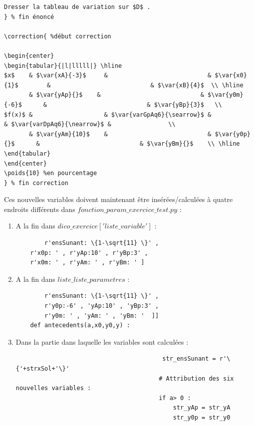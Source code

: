 {\begin{description}
\begin{description}
{\begin{verbatim}
Dresser la tableau de variation sur $D$ .
} % fin énoncé 

\correction{ %début correction 

\begin{center}
\begin{tabular}{|l|lllll|} \hline
$x$    & $\var{xA}{-3}$     &                            & $\var{x0}{1}$        &                            & $\var{xB}{4}$  \\ \hline
       & $\var{yAp}{}$    &                            & $\var{y0m}{-6}$      &                            & $\var{yBp}{3}$   \\ 
$f(x)$ &                    & $\var{varGpAq6}{\searrow}$ &                      & $\var{varDpAq6}{\nearrow}$ &                \\
       & $\var{yAm}{10}$    &                            & $\var{y0p}{}$      &                            & $\var{yBm}{}$    \\ \hline
\end{tabular}
\end{center}
\poids{10} %en pourcentage
} % fin correction   
  \end{verbatim}
  }
  Ces nouvelles variables doivent maintenant être insérées/calculées à quatre endroits différents dans $fonction\_param\_exercice\_test.py$ :
  \begin{enumerate}
   \item A la fin dans  $dico\_exercice['liste\_variable']$  :
   \begin{verbatim}
        r'ensSunant: \{1-\sqrt{11} \}' ,
    r'x0p: ' , r'yAp:10' , r'yBp:3' , 
    r'x0m: ' , r'yAm: ' , r'yBm: ' ]
   \end{verbatim}
   \item A la fin dans   $liste\_liste\_parametres$  :
\begin{verbatim}
        r'ensSunant: \{1-\sqrt{11} \}' ,
        r'y0p:-6' , 'yAp:10' , 'yBp:3' , 
        r'y0m: ' , 'yAm: ' , 'yBm: '  ]] 
    def antecedents(a,x0,y0,y) :
\end{verbatim}
\item Dans la partie dans laquelle les variables sont calculées :
\begin{verbatim}
                                         str_ensSunant = r'\{'+strxSol+'\}' 
                                        # Attribution des six nouvelles variables : 
                                        if a> 0 :
                                            str_yAp = str_yA
                                            str_y0p = str_y0

\end{verbatim}
\end{enumerate}
\end{description}
\end{description}}
